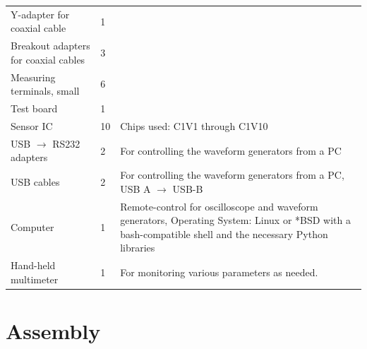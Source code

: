 \begin{centering}
\begin{xtabular}{
    >{\small}p{50mm}
    >{\small}p{8mm}
    >{\small}p{65mm}
}
    Y-adapter for coaxial cable &
    1                           &
    \\

    Breakout adapters for coaxial cables &
    3                                    &
    \\

    Measuring terminals, small &
    6                          &
    \\

    Test board &
    1          &
    \\

    Sensor IC                       &
    10                              &
    Chips used: C1V1 through C1V10  \\

    USB $\rightarrow$ RS232 adapters                  &
    2                                                 &
    For controlling the waveform generators from a PC \\

    USB cables                                        &
    2                                                 &
    For controlling the waveform generators from a PC,
    USB A $\rightarrow$ USB-B                         \\

    Computer                                                  &
    1                                                         &
    Remote-control for oscilloscope and waveform generators,
    Operating System: Linux  or *BSD with  a bash-compatible
    shell and the necessary Python libraries                  \\

    Hand-held multimeter                         &
    1                                            &
    For monitoring various parameters as needed. \\

    \bottomrule
\end{xtabular}
\end{centering}

\section{Assembly}
\label{sec:assembly}

